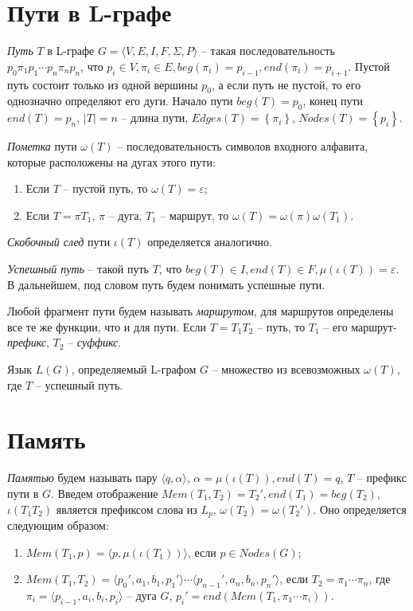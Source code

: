 \section{Пути в L-графе}
\emph{Путь} $T$ в L-графе $G=\langle V,E,I,F,\Sigma, P \rangle$ -- такая последовательность $p_0 \pi_1 p_1 \cdots p_n \pi_n p_n$, что 
$p_i \in V, \pi_i \in E, beg(\pi_i) = p_{i-1}, end(\pi_i) = p_{i+1}$.
Пустой путь состоит только из одной вершины $p_0$, а если путь не пустой, то его однозначно определяют его дуги.
Начало пути $beg(T) = p_0$, конец пути $end(T) = p_n$, $\left| T \right| = n$ -- длина пути, 
$Edges(T) = \left\{ \pi_i \right\}$, $Nodes(T) = \left\{ p_i \right\}$.

\emph{Пометка} пути $\omega(T)$ -- последовательность символов входного алфавита, которые расположены на дугах этого пути:
\begin{enumerate}[label=\arabic*)]
    \item Если $T$ -- пустой путь, то $\omega(T) = \varepsilon$;
    \item Если $T = \pi T_1$, $\pi$ -- дуга, $T_1$ -- маршрут, то $\omega(T) = \omega(\pi) \omega(T_1)$.
\end{enumerate}

\emph{Скобочный след} пути $\iota(T)$ определяется аналогично.


\emph{Успешный путь} -- такой путь $T$, что $beg(T) \in I, end(T) \in F, \mu(\iota(T)) = \varepsilon$.
В дальнейшем, под словом путь будем понимать успешные пути.

Любой фрагмент пути будем называть \emph{маршрутом}, для маршрутов определены все те же функции, что и для пути.
Если $T = T_1 T_2$ -- путь, то $T_1$ -- его маршрут-\emph{префикс}, $T_2$ -- \emph{суффикс}.

Язык $L(G)$, определяемый L-графом $G$ -- множество из всевозможных $\omega(T)$, где $T$ -- успешный путь.

\section{Память}
\emph{Памятью} будем называть пару $\langle q, \alpha \rangle$, $\alpha=\mu(\iota(T)), end(T)=q$, $T$ --  префикс пути в $G$. 
Введем отображение $Mem(T_1,T_2) = T_2', end(T_1) = beg(T_2)$, $\iota(T_1 T_2)$ является префиксом слова из $L_p$, $\omega(T_2) = \omega(T_2')$.
Оно определяется следующим образом:
\begin{enumerate}[label=\arabic*)]
    \item $Mem(T_1, p) = \langle p, \mu(\iota(T_1)) \rangle$, если $p \in Nodes(G)$;
    \item {
        $Mem(T_1, T_2) = \langle p_0', a_1, b_1, p_1' \rangle \cdots \langle p_{n-1}', a_n, b_n, p_n' \rangle$, если $T_2 =\pi_1 \cdots \pi_n$, 
        где $\pi_i = \langle p_{i-1}, a_i, b_i, p_i \rangle$ -- дуга $G$, $p_i' = end(Mem(T_1, \pi_1 \cdots \pi_i))$.
    }
\end{enumerate}

